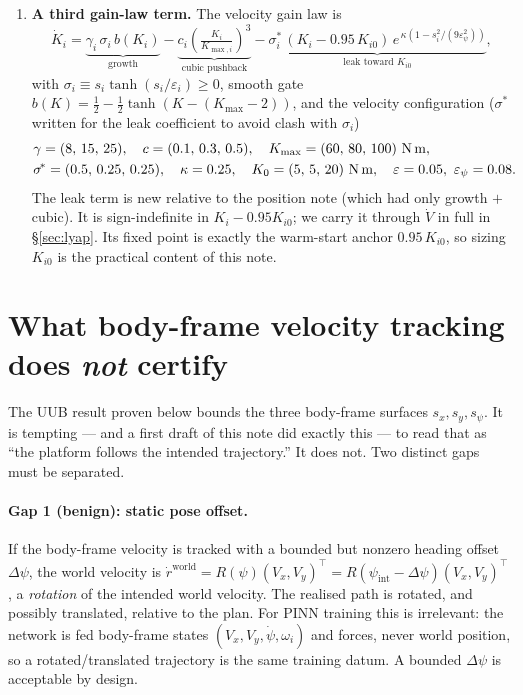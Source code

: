 \documentclass[11pt]{article}
\theoremstyle{plain}
\theoremstyle{definition}
\newcommand{\Vx}{V_x}
\newcommand{\Vy}{V_y}
\newcommand{\Tr}[1]{\tanh\!\left(#1\right)}
\begin{document}
\begin{enumerate}[leftmargin=2em]
\item \textbf{A third gain-law term.} The velocity gain law is
\begin{equation}
\dot K_i=\underbrace{\gamma_i\,\sigma_i\,b(K_i)}_{\text{growth}}
-\underbrace{c_i\!\left(\tfrac{K_i}{K_{\max,i}}\right)^{\!3}}_{\text{cubic pushback}}
-\underbrace{\sigma^{\!*}_i\,(K_i-0.95\,K_{i0})\,
e^{\,\kappa\left(1-s_i^2/(9\varepsilon_\psi^2)\right)}}_{\text{leak toward }K_{i0}},
\label{eq:gainlaw}
\end{equation}
with $\sigma_i\equiv s_i\Tr{s_i/\varepsilon_i}\ge0$, smooth gate
$b(K)=\tfrac12-\tfrac12\Tr{K-(K_{\max}-2)}$, and the velocity configuration
($\sigma^{\!*}$ written for the leak coefficient to avoid clash with $\sigma_i$)
\begin{align*}
&\gamma=(8,\,15,\,25),\quad c=(0.1,\,0.3,\,0.5),\quad
K_{\max}=(60,\,80,\,100)\ \text{N\,m},\\
&\sigma^{\!*}=(0.5,\,0.25,\,0.25),\quad \kappa=0.25,\quad
K_{0}=(5,\,5,\,20)\ \text{N\,m},\quad
\varepsilon=0.05,\ \varepsilon_\psi=0.08.
\end{align*}
The leak term is new relative to the position note (which had only growth $+$ cubic).
It is sign-indefinite in $K_i-0.95K_{i0}$; we carry it through $\dot V$ in full in
\S\ref{sec:lyap}. Its fixed point is exactly the warm-start anchor $0.95\,K_{i0}$,
so sizing $K_{i0}$ is the practical content of this note.
\end{enumerate}

\section{What body-frame velocity tracking does \emph{not} certify}
\label{sec:frame}

The UUB result proven below bounds the three body-frame surfaces $s_x,s_y,s_\psi$.
It is tempting --- and a first draft of this note did exactly this --- to read that as
``the platform follows the intended trajectory.'' It does not. Two distinct gaps
must be separated.

\paragraph{Gap 1 (benign): static pose offset.} If the body-frame velocity is tracked
with a bounded but nonzero heading offset $\Delta\psi$, the world velocity is
$\dot r^{\mathrm{world}}=R(\psi)(\Vx,\Vy)^\top=R(\psi_{\mathrm{int}}-\Delta\psi)(\Vx,\Vy)^\top$,
a \emph{rotation} of the intended world velocity. The realised path is rotated, and
possibly translated, relative to the plan. For PINN training this is irrelevant: the
network is fed body-frame states $(\Vx,\Vy,\dot\psi,\omega_i)$ and forces, never world
position, so a rotated/translated trajectory is the same training datum. A bounded
$\Delta\psi$ is acceptable by design.
\end{document}
